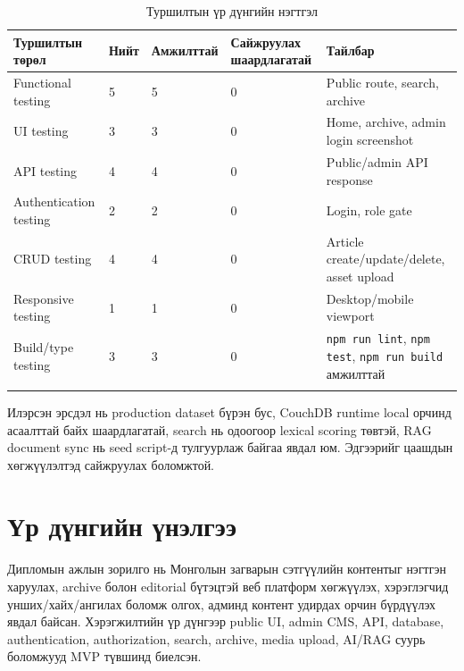 \begin{longtable}{|L{0.24\textwidth}|L{0.08\textwidth}|L{0.12\textwidth}|L{0.18\textwidth}|L{0.18\textwidth}|}
  \hline
  \textbf{Туршилтын төрөл} & \textbf{Нийт} & \textbf{Амжилттай} & \textbf{Сайжруулах шаардлагатай} & \textbf{Тайлбар} \\ \hline
  Functional testing & 5 & 5 & 0 & Public route, search, archive \\ \hline
  UI testing & 3 & 3 & 0 & Home, archive, admin login screenshot \\ \hline
  API testing & 4 & 4 & 0 & Public/admin API response \\ \hline
  Authentication testing & 2 & 2 & 0 & Login, role gate \\ \hline
  CRUD testing & 4 & 4 & 0 & Article create/update/delete, asset upload \\ \hline
  Responsive testing & 1 & 1 & 0 & Desktop/mobile viewport \\ \hline
  Build/type testing & 3 & 3 & 0 & \texttt{npm run lint}, \texttt{npm test}, \texttt{npm run build} амжилттай \\ \hline
  \caption{Туршилтын үр дүнгийн нэгтгэл}
  \label{tab:ch4-test-results}\\
\end{longtable}

Илэрсэн эрсдэл нь production dataset бүрэн бус, CouchDB runtime local орчинд асаалттай байх шаардлагатай, search нь одоогоор lexical scoring төвтэй, RAG document sync нь seed script-д тулгуурлаж байгаа явдал юм. Эдгээрийг цаашдын хөгжүүлэлтэд сайжруулах боломжтой.

\section{Үр дүнгийн үнэлгээ}
Дипломын ажлын зорилго нь Монголын загварын сэтгүүлийн контентыг нэгтгэн харуулах, archive болон editorial бүтэцтэй веб платформ хөгжүүлэх, хэрэглэгчид унших/хайх/ангилах боломж олгох, админд контент удирдах орчин бүрдүүлэх явдал байсан. Хэрэгжилтийн үр дүнгээр public UI, admin CMS, API, database, authentication, authorization, search, archive, media upload, AI/RAG суурь боломжууд MVP түвшинд биелсэн.

